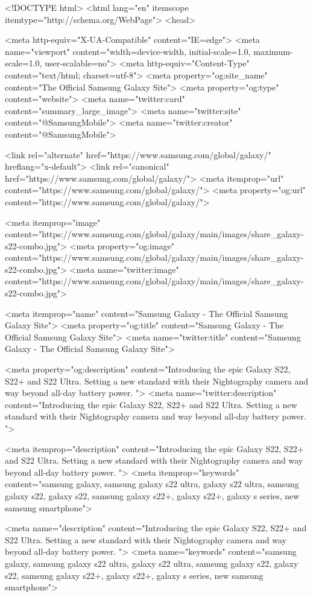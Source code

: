 <!DOCTYPE html>
<html lang="en" itemscope itemtype="http://schema.org/WebPage">
<head>

<meta http-equiv="X-UA-Compatible" content="IE=edge">
<meta name="viewport" content="width=device-width, initial-scale=1.0, maximum-scale=1.0, user-scalable=no">
<meta http-equiv="Content-Type" content="text/html; charset=utf-8">
<meta property="og:site_name" content="The Official Samsung Galaxy Site">
<meta property="og:type" content="website">
<meta name="twitter:card" content="summary_large_image">
<meta name="twitter:site" content="@SamsungMobile">
<meta name="twitter:creator" content="@SamsungMobile">

<link rel="alternate"      href="https://www.samsung.com/global/galaxy/" hreflang="x-default">
<link rel="canonical"      href="https://www.samsung.com/global/galaxy/">
<meta itemprop="url"    content="https://www.samsung.com/global/galaxy/">
<meta property="og:url" content="https://www.samsung.com/global/galaxy/">

<meta itemprop="image"     content="https://www.samsung.com/global/galaxy/main/images/share_galaxy-s22-combo.jpg">
<meta property="og:image"  content="https://www.samsung.com/global/galaxy/main/images/share_galaxy-s22-combo.jpg">
<meta name="twitter:image" content="https://www.samsung.com/global/galaxy/main/images/share_galaxy-s22-combo.jpg">

<meta itemprop="name"      content="Samsung Galaxy - The Official Samsung Galaxy Site">
<meta property="og:title"  content="Samsung Galaxy - The Official Samsung Galaxy Site">
<meta name="twitter:title" content="Samsung Galaxy - The Official Samsung Galaxy Site">

<meta property="og:description"  content="Introducing the epic Galaxy S22, S22+ and S22 Ultra. Setting a new standard with their Nightography camera and way beyond all-day battery power. ">
<meta name="twitter:description" content="Introducing the epic Galaxy S22, S22+ and S22 Ultra. Setting a new standard with their Nightography camera and way beyond all-day battery power. ">

<meta itemprop="description" content="Introducing the epic Galaxy S22, S22+ and S22 Ultra. Setting a new standard with their Nightography camera and way beyond all-day battery power. ">
<meta itemprop="keywords"    content="samsung galaxy, samsung galaxy s22 ultra, galaxy s22 ultra, samsung galaxy s22, galaxy s22, samsung galaxy s22+, galaxy s22+, galaxy s series, new samsung smartphone">

<meta name="description" content="Introducing the epic Galaxy S22, S22+ and S22 Ultra. Setting a new standard with their Nightography camera and way beyond all-day battery power. ">
<meta name="keywords"    content="samsung galaxy, samsung galaxy s22 ultra, galaxy s22 ultra, samsung galaxy s22, galaxy s22, samsung galaxy s22+, galaxy s22+, galaxy s series, new samsung smartphone">

